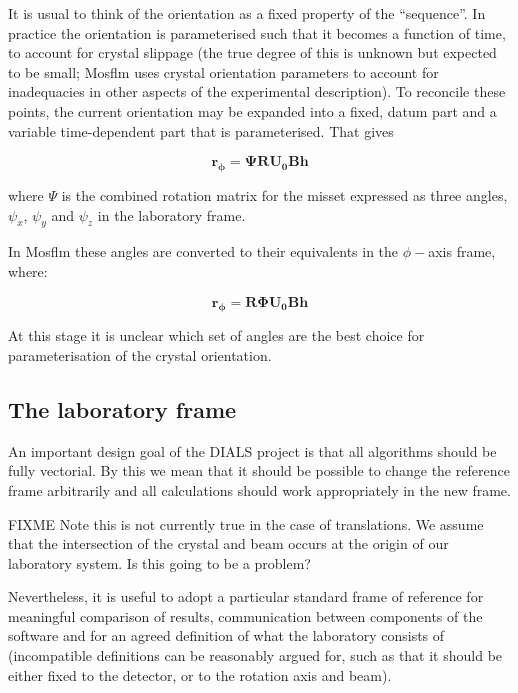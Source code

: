 \documentclass[a4paper, 11pt]{article}
\renewcommand{\vec}[1]{\mathbf{#1}}
\begin{document}
It is usual to think of the orientation as a fixed property of the ``sequence''.
In practice the orientation is parameterised such that it becomes a function
of time, to account for crystal slippage (the true degree of this is unknown but
expected to be small; Mosflm uses crystal orientation parameters to account for
inadequacies in other aspects of the experimental description). To reconcile
these points, the current orientation may be expanded into a fixed, datum part
and a variable time-dependent part that is parameterised. That gives

\begin{equation}
\vec{r_\phi} = \mathbf{\Psi}\mathbf{R}\mathbf{U_0}\mathbf{B}\vec{h}
\end{equation}

where $\Psi$ is the combined rotation matrix for the misset expressed as
three angles, $\psi_x$, $\psi_y$ and $\psi_z$ in the laboratory frame.

In Mosflm these angles are converted to their equivalents in the $\phi-$axis 
frame, where:

\begin{equation}
\vec{r_\phi} = \mathbf{R}\mathbf{\Phi}\mathbf{U_0}\mathbf{B}\vec{h}
\end{equation}

At this stage it is unclear which set of angles are the best choice for
parameterisation of the crystal orientation.

\subsection{The laboratory frame}

An important design goal of the DIALS project is that all algorithms should be
fully vectorial. By this we mean that it should be possible to change the
reference frame arbitrarily and all calculations should work appropriately in
the new frame.

FIXME Note this is not currently true in the case of translations. We assume that
the intersection of the crystal and beam occurs at the origin of our laboratory
system. Is this going to be a problem?

Nevertheless, it is useful to adopt a particular standard frame of reference for
meaningful comparison of results, communication between components of the
software and for an agreed definition of what the laboratory consists of
(incompatible definitions can be reasonably argued for, such as that it should
be either fixed to the detector, or to the rotation axis and beam).
\end{document}
